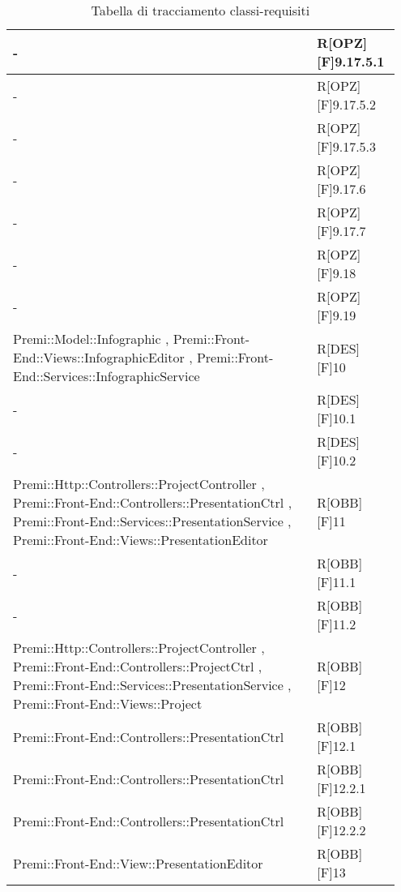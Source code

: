 \begin{table}[h]
	\begin{center}
		\begin{tabular}{|p{0.75\linewidth}|p{0.2\linewidth}|}
			\toprule
			- & R[OPZ][F]9.17.5.1 \\
		\midrule
			- & R[OPZ][F]9.17.5.2 \\
		\midrule
			- & R[OPZ][F]9.17.5.3 \\
		\midrule
			- & R[OPZ][F]9.17.6 \\
		\midrule
			- & R[OPZ][F]9.17.7 \\
		\midrule
			- & R[OPZ][F]9.18 \\
		\midrule
			- & R[OPZ][F]9.19 \\
		\midrule
			Premi::Model::Infographic , Premi::Front-End::Views::InfographicEditor , Premi::Front-End::Services::InfographicService & R[DES][F]10 \\
		\midrule
			- & R[DES][F]10.1 \\
		\midrule
			- & R[DES][F]10.2 \\
		\midrule
			Premi::Http::Controllers::ProjectController , Premi::Front-End::Controllers::PresentationCtrl , Premi::Front-End::Services::PresentationService , Premi::Front-End::Views::PresentationEditor & R[OBB][F]11 \\
		\midrule
			- & R[OBB][F]11.1 \\
		\midrule
			- & R[OBB][F]11.2 \\
		\midrule
			Premi::Http::Controllers::ProjectController , Premi::Front-End::Controllers::ProjectCtrl , Premi::Front-End::Services::PresentationService , Premi::Front-End::Views::Project & R[OBB][F]12 \\
		\midrule
			Premi::Front-End::Controllers::PresentationCtrl & R[OBB][F]12.1 \\
		\midrule
			Premi::Front-End::Controllers::PresentationCtrl & R[OBB][F]12.2.1 \\
		\midrule
			Premi::Front-End::Controllers::PresentationCtrl & R[OBB][F]12.2.2 \\
		\midrule
			Premi::Front-End::View::PresentationEditor & R[OBB][F]13 \\
			\bottomrule
		\end{tabular}
	\end{center}
	\caption{Tabella di tracciamento classi-requisiti}
\end{table}